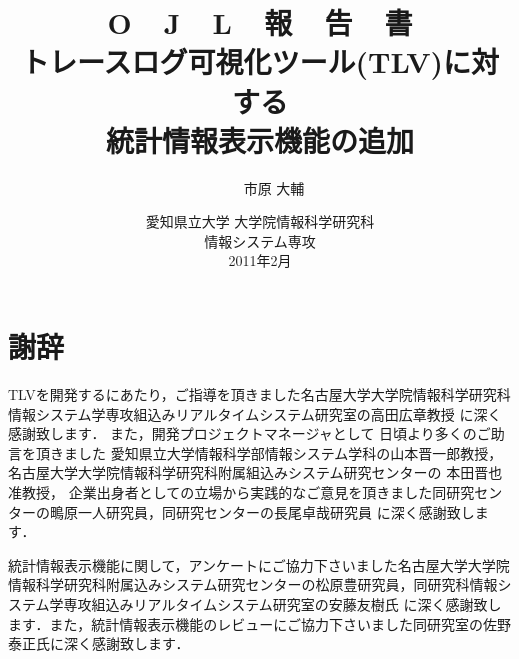 ﻿\documentclass[12pt,report]{jsbook}
\title{
{\LARGE\sffamily\gtfamily
O\ \ J\ \ L\ \ 報\ \ 告\ \ 書\\
}
\vspace*{.6in}
{\huge\sffamily\gtfamily
トレースログ可視化ツール(TLV)に対する\\
統計情報表示機能の追加\\
}
\vfill\vfill\vfill
}
\author{
\LARGE\sffamily\gtfamily
2009834003\ \ \ \ 市原 大輔\\
}
\date{
\vfill
\Large\sffamily\gtfamily
愛知県立大学 大学院情報科学研究科\\[.2in]
情報システム専攻\\[.2in]
2011年2月
\vfill
}
\begin{document}
\pagestyle{empty}
\maketitle
\pagestyle{plain} 
\setcounter{page}{1}
\setcounter{tocdepth}{2}
\tableofcontents

\clearpage
\pagestyle{plain} 
\setcounter{page}{1}

















\chapter*{謝辞}
TLVを開発するにあたり，ご指導を頂きました名古屋大学大学院情報科学研究科
情報システム学専攻組込みリアルタイムシステム研究室の高田広章教授
に深く感謝致します．
また，開発プロジェクトマネージャとして
日頃より多くのご助言を頂きました
愛知県立大学情報科学部情報システム学科の山本晋一郎教授，
名古屋大学大学院情報科学研究科附属組込みシステム研究センターの
本田晋也准教授，
企業出身者としての立場から実践的なご意見を頂きました同研究センターの鴫原一人研究員，同研究センターの長尾卓哉研究員
に深く感謝致します．

統計情報表示機能に関して，アンケートにご協力下さいました名古屋大学大学院情報科学研究科附属込みシステム研究センターの松原豊研究員，同研究科情報システム学専攻組込みリアルタイムシステム研究室の安藤友樹氏
に深く感謝致します．また，統計情報表示機能のレビューにご協力下さいました同研究室の佐野泰正氏に深く感謝致します．
\end{document}

